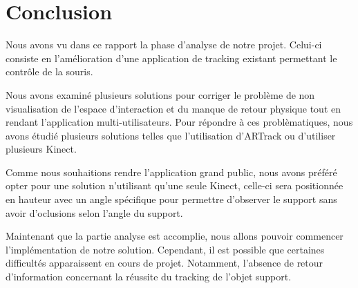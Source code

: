 \chapter{Conclusion}

Nous avons vu dans ce rapport la phase d'analyse de notre projet. Celui-ci consiste en l'amélioration d'une application de tracking existant permettant le contrôle de la souris. 

Nous avons examiné plusieurs solutions pour corriger le problème de non visualisation de l'espace d'interaction et du manque de retour physique tout en rendant l'application multi-utilisateurs. Pour répondre à ces problèmatiques, nous avons étudié plusieurs solutions telles que l'utilisation d'ARTrack ou d'utiliser plusieurs Kinect. 

Comme nous souhaitions rendre l'application grand public, nous avons préféré opter pour une solution n'utilisant qu'une seule Kinect, celle-ci sera positionnée en hauteur avec un angle spécifique pour permettre d'observer le support sans avoir d'oclusions selon l'angle du support. 

Maintenant que la partie analyse est accomplie, nous allons pouvoir commencer l'implémentation de notre solution. Cependant, il est possible que certaines difficultés apparaissent en cours de projet. Notamment, l'absence de retour d'information concernant la réussite du tracking de l'objet support.